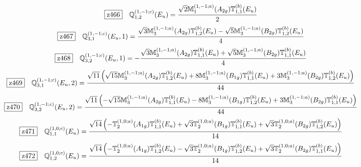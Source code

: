\documentclass[fleqn,10pt,landscape]{jsarticle}
\begin{document}
\begin{dmath*}
\hspace*{3mm}\fbox{z466}\quad \mathbb{Q}_{1,2}^{(1,-1;c)}(E_{u})=\frac{\sqrt{2} \mathbb{M}_{1}^{(1,-1;a)}(A_{2g}) \mathbb{T}_{1,1}^{(b)}(E_{u})}{2}
\end{dmath*}
\begin{dmath*}
\hspace*{3mm}\fbox{z467}\quad \mathbb{Q}_{3,1}^{(1,-1;c)}(E_{u},1)=\frac{\sqrt{3} \mathbb{M}_{3}^{(1,-1;a)}(A_{2g}) \mathbb{T}_{1,2}^{(b)}(E_{u}) - \sqrt{5} \mathbb{M}_{3}^{(1,-1;a)}(B_{2g}) \mathbb{T}_{1,2}^{(b)}(E_{u})}{4}
\end{dmath*}
\begin{dmath*}
\hspace*{3mm}\fbox{z468}\quad \mathbb{Q}_{3,2}^{(1,-1;c)}(E_{u},1)=- \frac{\sqrt{3} \mathbb{M}_{3}^{(1,-1;a)}(A_{2g}) \mathbb{T}_{1,1}^{(b)}(E_{u}) + \sqrt{5} \mathbb{M}_{3}^{(1,-1;a)}(B_{2g}) \mathbb{T}_{1,1}^{(b)}(E_{u})}{4}
\end{dmath*}
\begin{dmath*}
\hspace*{3mm}\fbox{z469}\quad \mathbb{Q}_{3,1}^{(1,-1;c)}(E_{u},2)=\frac{\sqrt{11} \left(\sqrt{15} \mathbb{M}_{3}^{(1,-1;a)}(A_{2g}) \mathbb{T}_{1,2}^{(b)}(E_{u}) + 8 \mathbb{M}_{3}^{(1,-1;a)}(B_{1g}) \mathbb{T}_{1,1}^{(b)}(E_{u}) + 3 \mathbb{M}_{3}^{(1,-1;a)}(B_{2g}) \mathbb{T}_{1,2}^{(b)}(E_{u})\right)}{44}
\end{dmath*}
\begin{dmath*}
\hspace*{3mm}\fbox{z470}\quad \mathbb{Q}_{3,2}^{(1,-1;c)}(E_{u},2)=\frac{\sqrt{11} \left(- \sqrt{15} \mathbb{M}_{3}^{(1,-1;a)}(A_{2g}) \mathbb{T}_{1,1}^{(b)}(E_{u}) - 8 \mathbb{M}_{3}^{(1,-1;a)}(B_{1g}) \mathbb{T}_{1,2}^{(b)}(E_{u}) + 3 \mathbb{M}_{3}^{(1,-1;a)}(B_{2g}) \mathbb{T}_{1,1}^{(b)}(E_{u})\right)}{44}
\end{dmath*}
\begin{dmath*}
\hspace*{3mm}\fbox{z471}\quad \mathbb{Q}_{1,1}^{(1,0;c)}(E_{u})=\frac{\sqrt{14} \left(- \mathbb{T}_{2}^{(1,0;a)}(A_{1g}) \mathbb{T}_{1,1}^{(b)}(E_{u}) + \sqrt{3} \mathbb{T}_{2}^{(1,0;a)}(B_{1g}) \mathbb{T}_{1,1}^{(b)}(E_{u}) + \sqrt{3} \mathbb{T}_{2}^{(1,0;a)}(B_{2g}) \mathbb{T}_{1,2}^{(b)}(E_{u})\right)}{14}
\end{dmath*}
\begin{dmath*}
\hspace*{3mm}\fbox{z472}\quad \mathbb{Q}_{1,2}^{(1,0;c)}(E_{u})=\frac{\sqrt{14} \left(- \mathbb{T}_{2}^{(1,0;a)}(A_{1g}) \mathbb{T}_{1,2}^{(b)}(E_{u}) - \sqrt{3} \mathbb{T}_{2}^{(1,0;a)}(B_{1g}) \mathbb{T}_{1,2}^{(b)}(E_{u}) + \sqrt{3} \mathbb{T}_{2}^{(1,0;a)}(B_{2g}) \mathbb{T}_{1,1}^{(b)}(E_{u})\right)}{14}
\end{dmath*}
\end{document}
